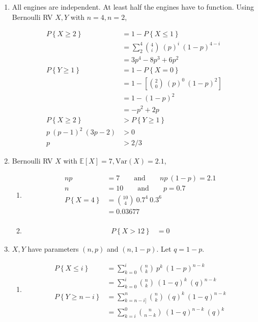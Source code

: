 \begin{enumerate}
	
	\item All engines are independent. At least half the engines have to function. Using Bernoulli RV $ X, Y $ with $ n = 4, n = 2 $,
	
	
		\begin{align}
			P \left\{X \geq 2 \right\} &= 1 - P \left\{X \leq 1 \right\} \\
			&= \sum\limits_{2}^{4} \binom{4}{i}\ (p)^i\ (1-p)^{4-i} \nonumber \\
			&= 3p^4 - 8p^3 + 6p^2 \\
			P \left\{Y \geq 1 \right\} &= 1 - P \left\{X = 0 \right\} \\
			&= 1 - \left[\binom{2}{0}\ (p)^0\ (1-p)^{2}\right] \nonumber \\
			&= 1 - (1-p)^2 \nonumber \\
			&= -p^2 + 2p \\
			P \left\{X \geq 2 \right\} &> P \left\{Y \geq 1 \right\} \\
			p\ (p-1)^2\ (3p-2) &> 0 \nonumber \\
			p &> 2/3
		\end{align}
	 
	
	\item Bernoulli RV $ X $ with $ \mathbb{E}[X] = 7, \mathrm{Var}(X) = 2.1 $,
	
	
		\begin{enumerate}
			\item \begin{align}
				np &= 7 \qquad \text{and} \qquad np\ (1-p) = 2.1 \nonumber \\
				n &= 10  \qquad \text{and} \qquad p = 0.7 \nonumber \\
				P \left\{X = 4\right\} &= \binom{10}{4} \ 0.7^4 \ 0.3^6 \nonumber \\
				&= 0.03677 \\
			\end{align}
			
			\item \begin{align}
				P \left\{X > 12\right\} &= 0
			\end{align}
		\end{enumerate}
	
	
	\item $ X, Y $ have parameters $ (n,p)$ and $ (n, 1-p) $. Let $ q = 1-p $.
	
		\begin{enumerate}
			\item \begin{align}
				P \left\{X \leq i \right\} &= \sum\limits_{k=0}^{i} \binom{n}{k} \ p^k \ (1-p)^{n-k} \nonumber \\
				&= \sum\limits_{k=0}^{i} \binom{n}{k} \ (1-q)^k \ (q)^{n-k}  \\
				P \left\{Y \geq n-i \right\}&= \sum\limits_{k=n-i]}^{n} \binom{n}{k} \ (q)^k \ (1-q)^{n-k} \nonumber \\
				&= \sum\limits_{k=i}^{0} \binom{n}{n-k} \ (1-q)^{n-k} \ (q)^{k} 
			\end{align}
			

\end{enumerate}
\end{enumerate}

